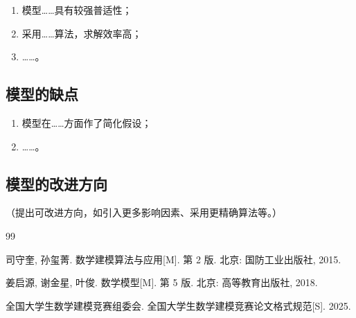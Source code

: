 \documentclass[a4paper, zihao=-4, fontset=windows]{ctexart}
\begin{document}
\begin{enumerate}
  \item 模型……具有较强普适性；
  \item 采用……算法，求解效率高；
  \item ……。
\end{enumerate}

\subsection{模型的缺点}

\begin{enumerate}
  \item 模型在……方面作了简化假设；
  \item ……。
\end{enumerate}

\subsection{模型的改进方向}

（提出可改进方向，如引入更多影响因素、采用更精确算法等。）

\begin{thebibliography}{99}

司守奎, 孙玺菁. 数学建模算法与应用[M]. 第 2 版. 北京: 国防工业出版社, 2015.

姜启源, 谢金星, 叶俊. 数学模型[M]. 第 5 版. 北京: 高等教育出版社, 2018.

全国大学生数学建模竞赛组委会. 全国大学生数学建模竞赛论文格式规范[S]. 2025.

\end{thebibliography}

\newpage

\appendix
\end{document}
